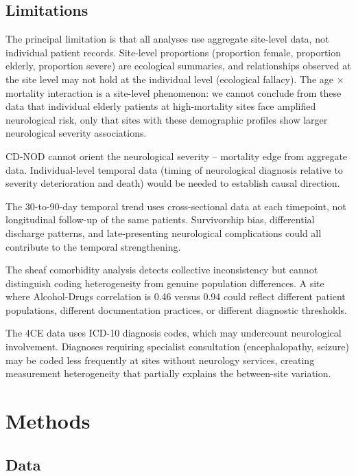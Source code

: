 \documentclass{article}
\begin{document}
\subsection{Limitations}

The principal limitation is that all analyses use aggregate site-level data, not individual patient records. Site-level proportions (proportion female, proportion elderly, proportion severe) are ecological summaries, and relationships observed at the site level may not hold at the individual level (ecological fallacy). The age $\times$ mortality interaction is a site-level phenomenon: we cannot conclude from these data that individual elderly patients at high-mortality sites face amplified neurological risk, only that sites with these demographic profiles show larger neurological severity associations.

CD-NOD cannot orient the neurological severity -- mortality edge from aggregate data. Individual-level temporal data (timing of neurological diagnosis relative to severity deterioration and death) would be needed to establish causal direction.

The 30-to-90-day temporal trend uses cross-sectional data at each timepoint, not longitudinal follow-up of the same patients. Survivorship bias, differential discharge patterns, and late-presenting neurological complications could all contribute to the temporal strengthening.

The sheaf comorbidity analysis detects collective inconsistency but cannot distinguish coding heterogeneity from genuine population differences. A site where Alcohol-Drugs correlation is 0.46 versus 0.94 could reflect different patient populations, different documentation practices, or different diagnostic thresholds.

The 4CE data uses ICD-10 diagnosis codes, which may undercount neurological involvement. Diagnoses requiring specialist consultation (encephalopathy, seizure) may be coded less frequently at sites without neurology services, creating measurement heterogeneity that partially explains the between-site variation.


\section{Methods}

\subsection{Data}
\end{document}
